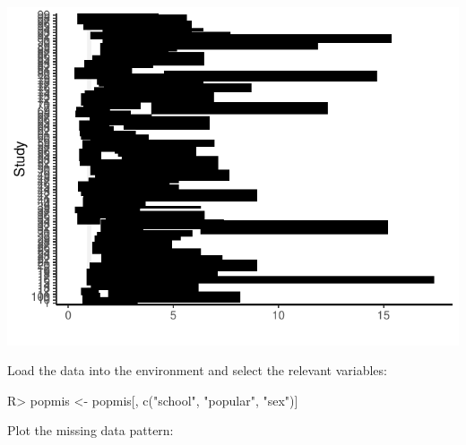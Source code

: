 \documentclass[
]{jss}
\begin{document}
\begin{CodeChunk}


\begin{center}\includegraphics{Imputation_of_Incomplete_Multilevel_Data_files/figure-latex/unnamed-chunk-3-1} \end{center}

\end{CodeChunk}

Load the data into the environment and select the relevant variables:

\begin{CodeChunk}
\begin{CodeInput}
R> popmis <- popmis[, c("school", "popular", "sex")] 
\end{CodeInput}
\end{CodeChunk}

Plot the missing data pattern:
\end{document}
